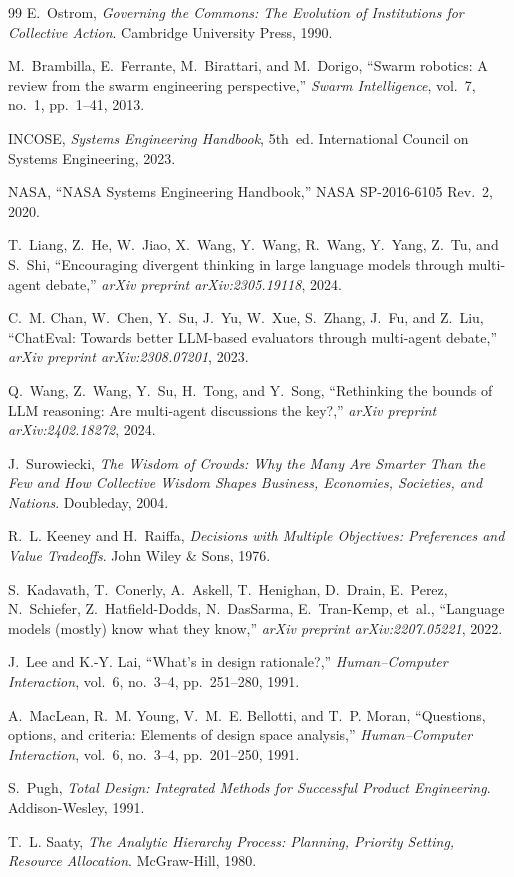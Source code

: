 \documentclass[11pt,a4paper]{article}
\begin{document}
\begin{thebibliography}{99}
E.~Ostrom, \emph{Governing the Commons: The Evolution of Institutions for Collective Action}. Cambridge University Press, 1990.

M.~Brambilla, E.~Ferrante, M.~Birattari, and M.~Dorigo, ``Swarm robotics: A review from the swarm engineering perspective,'' \emph{Swarm Intelligence}, vol.~7, no.~1, pp.~1--41, 2013.

INCOSE, \emph{Systems Engineering Handbook}, 5th~ed. International Council on Systems Engineering, 2023.

NASA, ``NASA Systems Engineering Handbook,'' NASA SP-2016-6105 Rev.~2, 2020.

T.~Liang, Z.~He, W.~Jiao, X.~Wang, Y.~Wang, R.~Wang, Y.~Yang, Z.~Tu, and S.~Shi, ``Encouraging divergent thinking in large language models through multi-agent debate,'' \emph{arXiv preprint arXiv:2305.19118}, 2024.

C.~M. Chan, W.~Chen, Y.~Su, J.~Yu, W.~Xue, S.~Zhang, J.~Fu, and Z.~Liu, ``ChatEval: Towards better LLM-based evaluators through multi-agent debate,'' \emph{arXiv preprint arXiv:2308.07201}, 2023.

Q.~Wang, Z.~Wang, Y.~Su, H.~Tong, and Y.~Song, ``Rethinking the bounds of LLM reasoning: Are multi-agent discussions the key?,'' \emph{arXiv preprint arXiv:2402.18272}, 2024.

J.~Surowiecki, \emph{The Wisdom of Crowds: Why the Many Are Smarter Than the Few and How Collective Wisdom Shapes Business, Economies, Societies, and Nations}. Doubleday, 2004.

R.~L. Keeney and H.~Raiffa, \emph{Decisions with Multiple Objectives: Preferences and Value Tradeoffs}. John Wiley \& Sons, 1976.

S.~Kadavath, T.~Conerly, A.~Askell, T.~Henighan, D.~Drain, E.~Perez, N.~Schiefer, Z.~Hatfield-Dodds, N.~DasSarma, E.~Tran-Kemp, et~al., ``Language models (mostly) know what they know,'' \emph{arXiv preprint arXiv:2207.05221}, 2022.

J.~Lee and K.-Y. Lai, ``What's in design rationale?,'' \emph{Human--Computer Interaction}, vol.~6, no.~3--4, pp.~251--280, 1991.

A.~MacLean, R.~M. Young, V.~M.~E. Bellotti, and T.~P. Moran, ``Questions, options, and criteria: Elements of design space analysis,'' \emph{Human--Computer Interaction}, vol.~6, no.~3--4, pp.~201--250, 1991.

S.~Pugh, \emph{Total Design: Integrated Methods for Successful Product Engineering}. Addison-Wesley, 1991.

T.~L. Saaty, \emph{The Analytic Hierarchy Process: Planning, Priority Setting, Resource Allocation}. McGraw-Hill, 1980.

\end{thebibliography}
\end{document}
